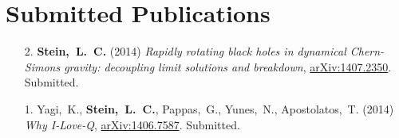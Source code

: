 
\section{\sc Submitted Publications}
\begin{enumerate}
\item[{2.}] {\bf Stein,~L.~C.} (2014)
  {\it Rapidly rotating black holes in dynamical Chern-Simons gravity:
    decoupling limit solutions and breakdown},
  \href{http://arxiv.org/abs/1407.2350}{arXiv:1407.2350}. Submitted.
\item[{1.}] Yagi,~K., {\bf Stein,~L.~C.}, Pappas,~G., Yunes,~N., Apostolatos,~T. (2014)
  {\it Why I-Love-Q},
  \href{http://arxiv.org/abs/1406.7587}{arXiv:1406.7587}. Submitted.
\end{enumerate}


